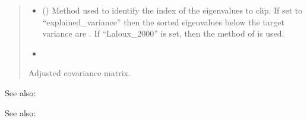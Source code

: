 \documentclass[letterpaper,10pt,english]{sphinxmanual}
\begin{document}
\begin{fulllineitems}
\begin{quote}
\begin{description}
\begin{itemize}
\item {}
\sphinxAtStartPar
{} () \textendash{} Method used to identify the index of the eigenvalues to clip. If set to
“explained\_variance” then the sorted eigenvalues below the target
variance are . If “Laloux\_2000” is set, then the method of
 is used.

\item {}
\sphinxAtStartPar
{}

\end{itemize}

\sphinxAtStartPar
Adjusted covariance matrix.

\sphinxAtStartPar
{}

\end{description}\end{quote}


\begin{sphinxseealso}{See also:}

\sphinxAtStartPar
{\hyperref[\detokenize{misc:glomar_gridding.covariance_tools.explained_variance_clip}]{}}


\end{sphinxseealso}



\begin{sphinxseealso}{See also:}

\sphinxAtStartPar
{\hyperref[\detokenize{misc:glomar_gridding.covariance_tools.laloux_clip}]{}}


\end{sphinxseealso}


\end{fulllineitems}

\end{document}
